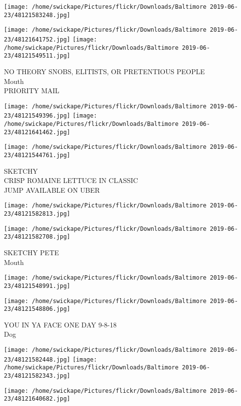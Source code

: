 \documentclass[10pt,letterpaper]{article}
\begin{document}
\texttt{[image: /home/swickape/Pictures/flickr/Downloads/Baltimore 2019-06-23/48121583248.jpg]}

\vspace{0.25in}
\texttt{[image: /home/swickape/Pictures/flickr/Downloads/Baltimore 2019-06-23/48121641752.jpg]}
\texttt{[image: /home/swickape/Pictures/flickr/Downloads/Baltimore 2019-06-23/48121549511.jpg]}

NO THEORY SNOBS, ELITISTS, OR PRETENTIOUS PEOPLE\\
Mouth\\
PRIORITY MAIL
\pagebreak

\texttt{[image: /home/swickape/Pictures/flickr/Downloads/Baltimore 2019-06-23/48121549396.jpg]}
\texttt{[image: /home/swickape/Pictures/flickr/Downloads/Baltimore 2019-06-23/48121641462.jpg]}

\texttt{[image: /home/swickape/Pictures/flickr/Downloads/Baltimore 2019-06-23/48121544761.jpg]}

SKETCHY\\
CRISP ROMAINE LETTUCE IN CLASSIC\\
JUMP AVAILABLE ON UBER
\pagebreak

\texttt{[image: /home/swickape/Pictures/flickr/Downloads/Baltimore 2019-06-23/48121582813.jpg]}

\vspace{0.25in}
\texttt{[image: /home/swickape/Pictures/flickr/Downloads/Baltimore 2019-06-23/48121582708.jpg]}

SKETCHY PETE\\
Mouth
\pagebreak

\texttt{[image: /home/swickape/Pictures/flickr/Downloads/Baltimore 2019-06-23/48121548991.jpg]}

\vspace{0.25in}
\texttt{[image: /home/swickape/Pictures/flickr/Downloads/Baltimore 2019-06-23/48121548806.jpg]}

YOU IN YA FACE ONE DAY 9{-}8{-}18\\
Dog
\pagebreak

\texttt{[image: /home/swickape/Pictures/flickr/Downloads/Baltimore 2019-06-23/48121582448.jpg]}
\texttt{[image: /home/swickape/Pictures/flickr/Downloads/Baltimore 2019-06-23/48121582343.jpg]}

\vspace{0.25in}
\texttt{[image: /home/swickape/Pictures/flickr/Downloads/Baltimore 2019-06-23/48121640682.jpg]}
\end{document}
